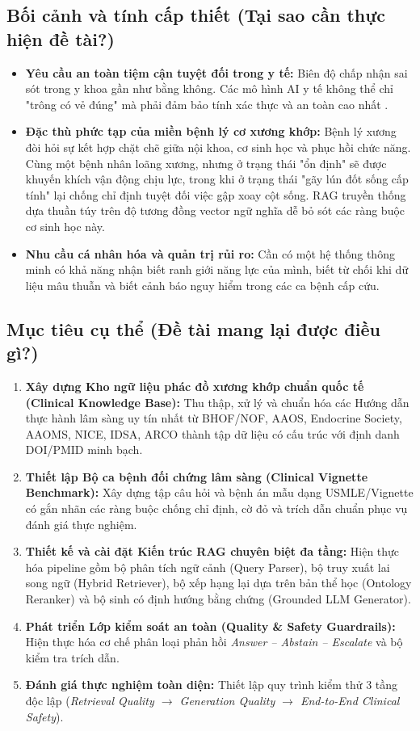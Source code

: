 \documentclass[12pt,a4paper]{article}
\begin{document}
\subsection{Bối cảnh và tính cấp thiết (Tại sao cần thực hiện đề tài?)}
\begin{itemize}[leftmargin=1.27cm]
    \item \textbf{Yêu cầu an toàn tiệm cận tuyệt đối trong y tế:} Biên độ chấp nhận sai sót trong y khoa gần như bằng không. Các mô hình AI y tế không thể chỉ "trông có vẻ đúng" mà phải đảm bảo tính xác thực và an toàn cao nhất \cite{medrag2024}.
    \item \textbf{Đặc thù phức tạp của miền bệnh lý cơ xương khớp:} Bệnh lý xương đòi hỏi sự kết hợp chặt chẽ giữa nội khoa, cơ sinh học và phục hồi chức năng. Cùng một bệnh nhân loãng xương, nhưng ở trạng thái "ổn định" sẽ được khuyến khích vận động chịu lực, trong khi ở trạng thái "gãy lún đốt sống cấp tính" lại chống chỉ định tuyệt đối việc gập xoay cột sống. RAG truyền thống dựa thuần túy trên độ tương đồng vector ngữ nghĩa dễ bỏ sót các ràng buộc cơ sinh học này.
    \item \textbf{Nhu cầu cá nhân hóa và quản trị rủi ro:} Cần có một hệ thống thông minh có khả năng nhận biết ranh giới năng lực của mình, biết từ chối khi dữ liệu mâu thuẫn và biết cảnh báo nguy hiểm trong các ca bệnh cấp cứu.
\end{itemize}

\subsection{Mục tiêu cụ thể (Đề tài mang lại được điều gì?)}
\begin{enumerate}[leftmargin=1.27cm, label=\arabic*.]
    \item \textbf{Xây dựng Kho ngữ liệu phác đồ xương khớp chuẩn quốc tế (Clinical Knowledge Base):} Thu thập, xử lý và chuẩn hóa các Hướng dẫn thực hành lâm sàng uy tín nhất từ BHOF/NOF, AAOS, Endocrine Society, AAOMS, NICE, IDSA, ARCO thành tập dữ liệu có cấu trúc với định danh DOI/PMID minh bạch.
    \item \textbf{Thiết lập Bộ ca bệnh đối chứng lâm sàng (Clinical Vignette Benchmark):} Xây dựng tập câu hỏi và bệnh án mẫu dạng USMLE/Vignette có gắn nhãn các ràng buộc chống chỉ định, cờ đỏ và trích dẫn chuẩn phục vụ đánh giá thực nghiệm.
    \item \textbf{Thiết kế và cài đặt Kiến trúc RAG chuyên biệt đa tầng:} Hiện thực hóa pipeline gồm bộ phân tích ngữ cảnh (Query Parser), bộ truy xuất lai song ngữ (Hybrid Retriever), bộ xếp hạng lại dựa trên bản thể học (Ontology Reranker) và bộ sinh có định hướng bằng chứng (Grounded LLM Generator).
    \item \textbf{Phát triển Lớp kiểm soát an toàn (Quality \& Safety Guardrails):} Hiện thực hóa cơ chế phân loại phản hồi \textit{Answer -- Abstain -- Escalate} và bộ kiểm tra trích dẫn.
    \item \textbf{Đánh giá thực nghiệm toàn diện:} Thiết lập quy trình kiểm thử 3 tầng độc lập (\textit{Retrieval Quality $\to$ Generation Quality $\to$ End-to-End Clinical Safety}).
\end{enumerate}
\end{document}
